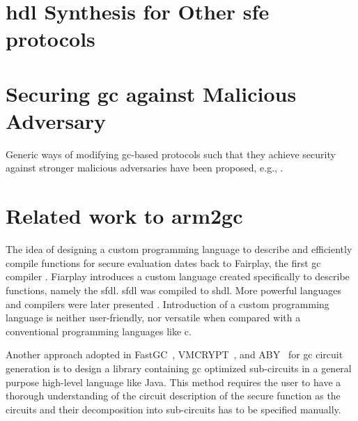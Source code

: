 \section{\acrshort{hdl} Synthesis for Other \acrshort{sfe} protocols}

\section{Securing \acrshort{gc} against Malicious Adversary}
Generic ways of modifying \acrshort{gc}-based protocols such that they achieve security against stronger malicious adversaries have been proposed, e.g., \cite{lindell2007efficient, lindell2012secure, nielsen2009lego}.

\section{Related work to \gls{arm2gc}}
The idea of designing a custom programming language to describe and efficiently compile functions for secure evaluation dates back to Fairplay, the first \acrshort{gc} compiler \cite{malkhi2004fairplay}.
Fiarplay introduces a custom language created specifically to describe functions, namely the \acrfull{sfdl}.
\acrshort{sfdl} was compiled to \acrfull{shdl}.
More powerful languages and compilers were later presented \cite{henecka2010tasty, kreuter2012billion, rastogi2014wysteria}.
Introduction of a custom programming language is neither user-friendly, nor versatile when compared with a conventional programming languages like \gls{c}.

Another approach adopted in FastGC~\cite{huang2011faster, henecka2013faster}, VMCRYPT~\cite{malka2011vmcrypt}, and ABY~\cite{demmler2015aby} for \acrshort{gc} circuit generation is to design a library containing \acrshort{gc} optimized sub-circuits in a general purpose high-level language like Java.
This method requires the user to have a thorough understanding of the circuit description of the secure function as the circuits and their decomposition into sub-circuits has to be specified manually.

